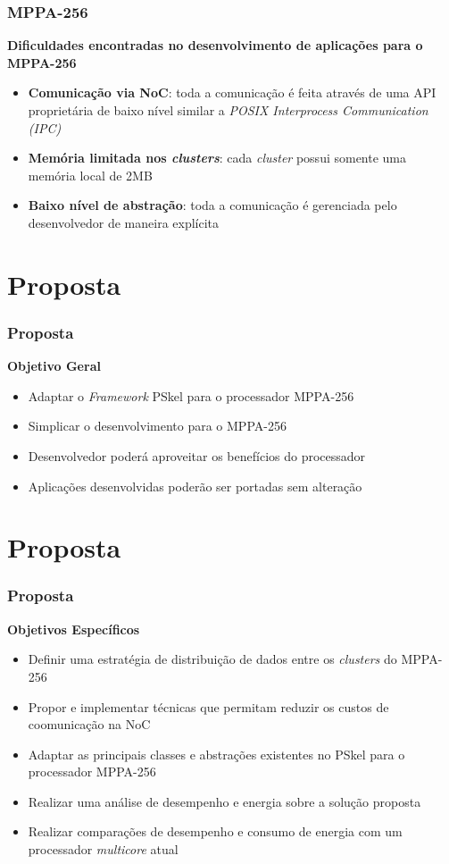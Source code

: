 \documentclass[xcolor={table}]{beamer}
\newcommand{\Fw}{\textit{Framework}\xspace}
\begin{document}
\begin{frame}\frametitle{MPPA-256}
    \textbf{Dificuldades encontradas no desenvolvimento de aplicações para o MPPA-256}

    \begin{itemize}
        \item \textbf{Comunicação via NoC}: toda a comunicação é feita através de uma API proprietária de baixo nível similar a \textit{POSIX Interprocess Communication (IPC)}
        \item \textbf{Memória limitada nos \textit{clusters}}: cada \textit{cluster} possui somente uma memória local de 2MB
        \item \textbf{Baixo nível de abstração}: toda a comunicação é gerenciada pelo desenvolvedor de maneira explícita
    \end{itemize}
\end{frame}


\section{Proposta}
\begin{frame}\frametitle{Proposta}
    \textbf{Objetivo Geral}
    \begin{itemize}
        \item {Adaptar o \Fw PSkel para o processador MPPA-256}
                \item {Simplicar o desenvolvimento para o MPPA-256}
                \item {Desenvolvedor poderá aproveitar os benefícios do processador}
                \item {Aplicações desenvolvidas poderão ser portadas sem alteração}
    \end{itemize}
\end{frame}


\section{Proposta}
\begin{frame}\frametitle{Proposta}
    \textbf{Objetivos Específicos}
    \begin{itemize}
        \item {Definir uma estratégia de distribuição de dados entre os \textit{clusters} do MPPA-256}
        \item {Propor e implementar técnicas que permitam reduzir os custos de coomunicação na NoC}
        \item {Adaptar as principais classes e abstrações existentes no PSkel para o processador MPPA-256}
        \item {Realizar uma análise de desempenho e energia sobre a solução proposta}
        \item {Realizar comparações de desempenho e consumo de energia com um processador \textit{multicore} atual}
    \end{itemize}
\end{frame}
\end{document}
